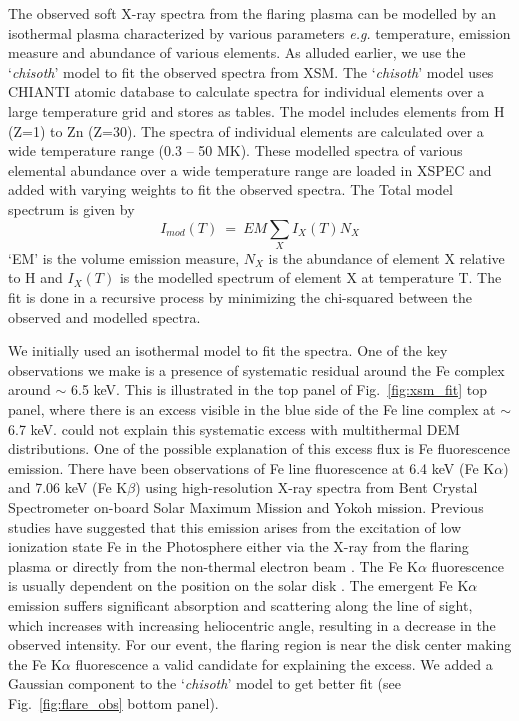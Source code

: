 The observed soft X-ray spectra from the flaring plasma can be modelled by an isothermal plasma characterized by various parameters {\it e.g.} temperature, emission measure and abundance of various elements. As alluded earlier, we use the `{\it chisoth}' model \citep{mondal21} to fit the observed spectra from XSM. The `{\it chisoth}' model uses CHIANTI atomic database \cite{chianti} to calculate spectra for individual elements over a large temperature grid and stores as tables. The model includes elements from H (Z=1) to Zn (Z=30). The spectra of individual elements are calculated over a wide temperature range (0.3 {--} 50 MK). These modelled spectra of various elemental abundance over a wide temperature range are loaded in XSPEC and added with varying weights to fit the observed spectra. The Total model spectrum is given by  $$I_{mod}(T)~=~EM\sum_{X}I_{X}(T)N_{X}$$`EM' is the volume emission measure, $N_{X}$ is the abundance of element X relative to H and $I_{X}(T)$ is the modelled spectrum of element X at temperature T. The fit is done in a recursive process by minimizing the chi-squared between the observed and modelled spectra.

We initially used an isothermal model to fit the spectra. One of the key observations we make is a presence of systematic residual around the Fe complex around $\sim$ 6.5 keV. This is illustrated in the top panel of Fig.~\ref{fig:xsm_fit} top panel, where there is an excess visible in the blue side of the Fe line complex at $\sim$ 6.7 keV. \cite{mithun22} could not explain this systematic excess with multithermal DEM distributions. One of the possible explanation of this excess flux is Fe fluorescence emission. There have been observations of Fe line fluorescence at 6.4 keV (Fe K$\alpha$) and 7.06 keV (Fe K$\beta$) \citep{neupert67,doscheck71,bai79,tanaka84,parmar84,phillips12} using high-resolution X-ray spectra from Bent Crystal Spectrometer on-board Solar Maximum Mission \citep[Bent/{\it SMM},][]{bent,smm} and Yokoh \citep{yokoh} mission. Previous studies have suggested that this emission arises from the excitation of low ionization state Fe in the Photosphere either via the X-ray from the flaring plasma \citep{bai79} or directly from the non-thermal electron beam \citep{phillips73}. The Fe K$\alpha$ fluorescence is usually dependent on the position on the solar disk \citep{parmar84}. The emergent Fe K$\alpha$ emission suffers significant absorption and scattering along the line of sight, which increases with increasing heliocentric angle, resulting in a decrease in the observed intensity. For our event, the flaring region is near the disk center making the Fe K$\alpha$ fluorescence a valid candidate for explaining the excess. We added a Gaussian component to the `{\it chisoth}' model to get better fit (see Fig.~\ref{fig:flare_obs} bottom panel).

